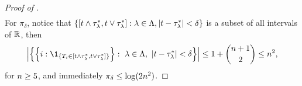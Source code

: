 \begin{proof}[Proof of ]
\begin{align*}
    \end{align*}
    For $\pi_\delta$, notice that $\{[{t} \wedge {\tau^*_\lambda}, {t} \vee {\tau^*_\lambda}]: \lambda \in \Lambda, |{t} - {\tau^*_\lambda}| < \delta\}$ is a subset of all intervals of $\mathbb{R}$, then
    \begin{align*}
         \left|\left\{\left\{i: \1_{\{\testStatistics{i} \in [\threshold \wedge \trueThreshold, \threshold \vee \trueThreshold]\}}\right\}: ~\lambda \in \Lambda, ~|\threshold - \trueThreshold| < \delta \right\}\right|
         \le 1 + \binom{\No+1}{2}
         \le \No^2,
    \end{align*}
    for ${n} \ge 5$, and immediately $\pi_\delta \le \log(2{n}^2)$. %
\end{proof}


